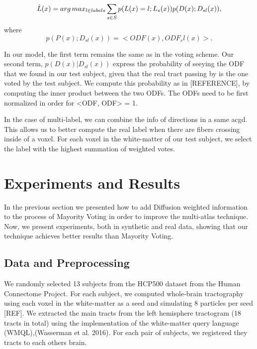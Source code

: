 \begin{equation}
\label{eq:argmax}
\hat L(x) = arg\,max_{l \in labels} \sum_{s\in S} p(L(x) = l ; L_s(x)) p(D(x) ; D_{sl}(x)),
\end{equation}
where
\begin{equation}
\label{eq:peaks}
p(P(x) ; D_{sl}(x)) = <ODF(x), ODF_sl(x)>.
\end{equation}

In our model, the first term remains the same as in the voting scheme.
Our second term, $p(D(x) | D_{sl}(x))$ express the probability
of seeying the ODF that we found in our test subject, given that the real
tract passing by is the one voted by the test subject. We compute this
probability as in [REFERENCE], by computing the inner product between the
two ODFs. The ODFs need to be first normalized in order for <ODF, ODF> = 1.

In the case of multi-label, we can combine the info of directions in a same acgd.
This allows us to better compute the real label when there are fibers crossing
inside of a voxel.
For each voxel in the white-matter of our test subject, we select the label
with the highest summation of weighted votes. 

\section{Experiments and Results}

In the previous section we presented how to add Diffusion weighted information
to the process of Mayority Voting in order to improve the multi-atlas technique.
Now, we present experiments, both in synthetic and real data, showing that
our technique achieves better results than Mayority Voting.

\subsection{Data and Preprocessing}
We randomly selected 13 subjects from the HCP500 dataset from the Human
Connectome Project. For each subject, we computed whole-brain tractography
using each voxel in the white-matter as a seed and simulating 8 particles per
seed [REF]. We extracted the main tracts from the left hemisphere tractogram
(18 tracts in total) using the implementation of the white-matter query
language (WMQL),(Wasserman et al. 2016). For each pair of subjects, we
registered they tracts to each others brain.

